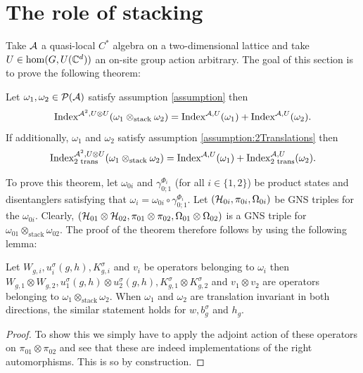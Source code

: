 \documentclass[11pt,a4paper,twoside]{article}
\numberwithin{equation}{section}
\begin{document}
	\section{The role of stacking}\label{sec:the-role-of-stacking}
	Take $\AA$ a quasi-local $C^*$ algebra on a two-dimensional lattice and take $U\in\hom(G,U(\CC^d))$ an on-site group action arbitrary. The goal of this section is to prove the following theorem:
	\begin{theorem}\label{th:IndexMorphismUnderStacking}
		Let $\omega_1,\omega_2\in\PP(\AA)$ satisfy assumption \ref{assumption} then
		\begin{equation}\label{eq:IndexMorphismUnderStacking}
			\textrm{Index}^{\AA^2,U\otimes U}(\omega_1\otimes_{\text{stack}}\omega_2)=\textrm{Index}^{\AA,U}(\omega_1)+\textrm{Index}^{\AA,U}(\omega_2).
		\end{equation}
		If additionally, $\omega_1$ and $\omega_2$ satisfy assumption \ref{assumption:2Translations} then
		\begin{equation}\label{eq:IndexMorphismUnderStackingTwoTranslations}
			\textrm{Index}^{\AA^2,U\otimes U}_{\text{2 trans}}(\omega_1\otimes_{\text{stack}}\omega_2)=\textrm{Index}^{\AA,U}(\omega_1)+\textrm{Index}^{\AA,U}_{\text{2 trans}}(\omega_2).
		\end{equation}
	\end{theorem}
	To prove this theorem, let $\omega_{0i}$ and $\gamma_{0;1}^{\Phi_i}$ (for all $i\in\{1,2\}$) be product states and disentanglers satisfying that $\omega_i=\omega_{0i}\circ\gamma_{0;1}^{\Phi_i}$. Let $(\HH_{0i},\pi_{0i},\Omega_{0i})$ be GNS triples for the $\omega_{0i}$. Clearly, $(\HH_{01}\otimes\HH_{02},\pi_{01}\otimes\pi_{02},\Omega_{01}\otimes\Omega_{02})$ is a GNS triple for $\omega_{01}\otimes_{\text{stack}}\omega_{02}$. The proof of the theorem therefore follows by using the following lemma:
	\begin{lemma}
		Let $W_{g,i},u^\sigma_i(g,h),K_{g,i}^\sigma$ and $v_{i}$ be operators belonging to $\omega_i$ then $W_{g,1}\otimes W_{g,2},u^\sigma_1(g,h)\otimes u^\sigma_2(g,h),K_{g,1}^\sigma\otimes K_{g,2}^\sigma$ and $v_{1}\otimes v_{2}$ are operators belonging to $\omega_1\otimes_{\text{stack}}\omega_2$. When $\omega_1$ and $\omega_2$ are translation invariant in both directions, the similar statement holds for $w,b_g^\sigma$ and $h_g$.
	\end{lemma}
	\begin{proof}
		To show this we simply have to apply the adjoint action of these operators on $\pi_{01}\otimes\pi_{02}$ and see that these are indeed implementations of the right automorphisms. This is so by construction.
	\end{proof}
\end{document}
